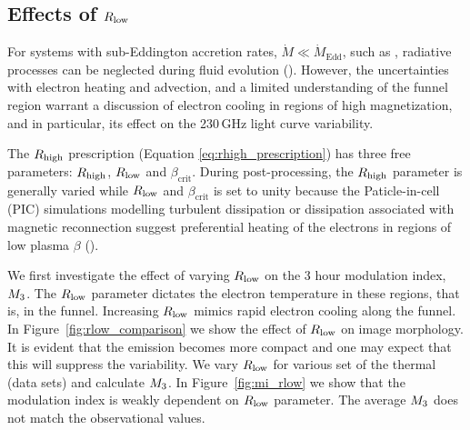%
\subsection{Effects of \texorpdfstring{$R_\mathrm{low}$}{Rl} } %

For systems with sub-Eddington accretion rates, $\Dot{M}\ll\Dot{M}_\mathrm{Edd}$, such as \sgra, radiative processes can be neglected during fluid evolution (\citealt{2012MNRAS.426.1928D, 10.1093/mnras/stw3116, Ryan_2017}).
However, the uncertainties with electron heating and advection, and a limited understanding of the funnel region warrant a discussion of electron cooling in regions of high magnetization, and in particular, its effect on the 230\,GHz light curve variability.

The $R_\mathrm{high}$ prescription (Equation \ref{eq:rhigh_prescription}) has three free parameters: $R_\mathrm{high}$, $R_\mathrm{low}$ and $\beta_\mathrm{crit}$. During post-processing, the $R_\mathrm{high}$ parameter is generally varied while $R_\mathrm{low}$ and $\beta_\mathrm{crit}$ is set to unity because the Paticle-in-cell (PIC) simulations modelling turbulent dissipation or dissipation associated with magnetic reconnection suggest preferential heating of the electrons in regions of low plasma $\beta$ (\citealt{2010MNRAS.409L.104H, Rowan_2017, 10.1093/mnras/stx2530, Rowan_2019, Kawazura771, PhysRevX.10.041050, kawazura2021energy}).

We first investigate the effect of varying $R_\mathrm{low}$ on the 3 hour modulation index, $M_{3}$. The $R_\mathrm{low}$ parameter dictates the electron temperature in these regions, that is, in the funnel. Increasing $R_\mathrm{low}$ mimics rapid electron cooling along the funnel.
In Figure~\ref{fig:rlow_comparison} we show the effect of $R_\mathrm{low}$ on image morphology. It is evident that the emission becomes more compact and one may expect that this will suppress the variability.
We vary $R_\mathrm{low}$ for various set of the thermal (\kharma data sets) and calculate $M_{3}$. In Figure~\ref{fig:mi_rlow} we show that the modulation index is weakly dependent on $R_\mathrm{low}$ parameter.
The average $M_{3}$ does not match the observational values.


